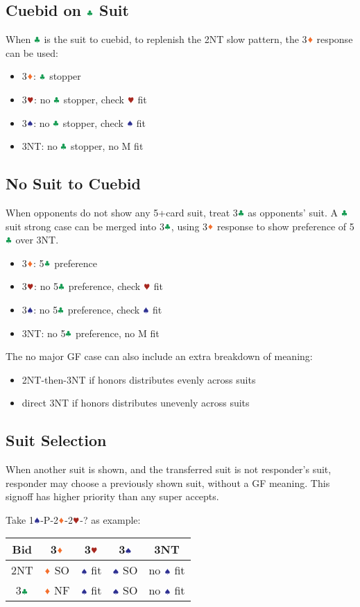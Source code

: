 \documentclass{article}
\begin{document}
\begin{multicols}{2}
\subsection{Cuebid on $\ccc$ Suit}
When $\ccc$ is the suit to cuebid, to replenish the 2NT slow pattern, the 3$\ddd$ response can be used:
\begin{itemize}
    \item 3$\ddd$: $\ccc$ stopper
    \item 3$\hhh$: no $\ccc$ stopper, check $\hhh$ fit
    \item 3$\sss$: no $\ccc$ stopper, check $\sss$ fit
    \item 3NT: no $\ccc$ stopper, no M fit
\end{itemize}

\subsection{No Suit to Cuebid}
When opponents do not show any 5+card suit, treat 3$\ccc$ as opponents' suit. A $\ccc$ suit strong case can be merged into 3$\ccc$, using 3$\ddd$ response to show preference of 5$\ccc$ over 3NT.
\begin{itemize}
    \item 3$\ddd$: 5$\ccc$ preference
    \item 3$\hhh$: no 5$\ccc$ preference, check $\hhh$ fit
    \item 3$\sss$: no 5$\ccc$ preference, check $\sss$ fit
    \item 3NT: no 5$\ccc$ preference, no M fit
\end{itemize}

\noindent The no major GF case can also include an extra breakdown of meaning:
\begin{itemize}
    \item 2NT-then-3NT if honors distributes evenly across suits
    \item direct 3NT if honors distributes unevenly across suits
\end{itemize}

\subsection{Suit Selection}
When another suit is shown, and the transferred suit is not responder's suit, responder may choose a previously shown suit, without a GF meaning. This signoff has higher priority than any super accepts.

\noindent Take 1$\sss$-P-2$\ddd$-2$\hhh$-? as example: \\
\begin{tabular}{c|c|c|c|c}
    \hline
    Bid & 3$\ddd$ & 3$\hhh$ & 3$\sss$ & 3NT \\ \hline\hline
    2NT & $\ddd$ SO & $\sss$ fit & $\sss$ SO & no $\sss$ fit \\ \hline
    3$\ccc$ & $\ddd$ NF & $\sss$ fit & $\sss$ SO & no $\sss$ fit \\ \hline
\end{tabular}


\end{multicols}
\end{document}

